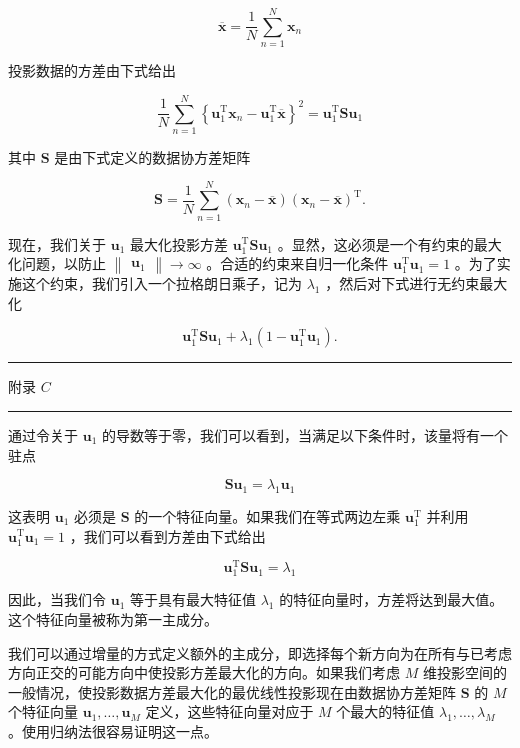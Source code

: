 \documentclass[10pt]{article}
\newcommand{\HRule}{\begin{center}\rule{0.9\linewidth}{0.2mm}\end{center}}
\begin{document}
\[
\overline{\mathbf{x}} = \frac{1}{N}\mathop{\sum }\limits_{{n = 1}}^{N}{\mathbf{x}}_{n} \tag{16.1}
\]

投影数据的方差由下式给出

\[
\frac{1}{N}\mathop{\sum }\limits_{{n = 1}}^{N}{\left\{  {\mathbf{u}}_{1}^{\mathrm{T}}{\mathbf{x}}_{n} - {\mathbf{u}}_{1}^{\mathrm{T}}\overline{\mathbf{x}}\right\}  }^{2} = {\mathbf{u}}_{1}^{\mathrm{T}}\mathbf{S}{\mathbf{u}}_{1} \tag{16.2}
\]

其中 \(\mathbf{S}\) 是由下式定义的数据协方差矩阵

\[
\mathbf{S} = \frac{1}{N}\mathop{\sum }\limits_{{n = 1}}^{N}\left( {{\mathbf{x}}_{n} - \overline{\mathbf{x}}}\right) {\left( {\mathbf{x}}_{n} - \overline{\mathbf{x}}\right) }^{\mathrm{T}}. \tag{16.3}
\]

现在，我们关于 \({\mathbf{u}}_{1}\) 最大化投影方差 \({\mathbf{u}}_{1}^{\mathrm{T}}\mathbf{S}{\mathbf{u}}_{1}\) 。显然，这必须是一个有约束的最大化问题，以防止 \(\begin{Vmatrix}{\mathbf{u}}_{1}\end{Vmatrix} \rightarrow  \infty\) 。合适的约束来自归一化条件 \({\mathbf{u}}_{1}^{\mathrm{T}}{\mathbf{u}}_{1} = 1\) 。为了实施这个约束，我们引入一个拉格朗日乘子，记为 \({\lambda }_{1}\) ，然后对下式进行无约束最大化

\[
{\mathbf{u}}_{1}^{\mathrm{T}}\mathbf{S}{\mathbf{u}}_{1} + {\lambda }_{1}\left( {1 - {\mathbf{u}}_{1}^{\mathrm{T}}{\mathbf{u}}_{1}}\right) . \tag{16.4}
\]

\HRule

附录 \(C\)

\HRule

通过令关于 \({\mathbf{u}}_{1}\) 的导数等于零，我们可以看到，当满足以下条件时，该量将有一个驻点

\[
\mathbf{S}{\mathbf{u}}_{1} = {\lambda }_{1}{\mathbf{u}}_{1} \tag{16.5}
\]

这表明 \({\mathbf{u}}_{1}\) 必须是 \(\mathbf{S}\) 的一个特征向量。如果我们在等式两边左乘 \({\mathbf{u}}_{1}^{\mathrm{T}}\) 并利用 \({\mathbf{u}}_{1}^{\mathrm{T}}{\mathbf{u}}_{1} = 1\) ，我们可以看到方差由下式给出

\[
{\mathbf{u}}_{1}^{\mathrm{T}}\mathbf{S}{\mathbf{u}}_{1} = {\lambda }_{1} \tag{16.6}
\]

因此，当我们令 \({\mathbf{u}}_{1}\) 等于具有最大特征值 \({\lambda }_{1}\) 的特征向量时，方差将达到最大值。这个特征向量被称为第一主成分。

我们可以通过增量的方式定义额外的主成分，即选择每个新方向为在所有与已考虑方向正交的可能方向中使投影方差最大化的方向。如果我们考虑 \(M\) 维投影空间的一般情况，使投影数据方差最大化的最优线性投影现在由数据协方差矩阵 \(\mathbf{S}\) 的 \(M\) 个特征向量 \({\mathbf{u}}_{1},\ldots ,{\mathbf{u}}_{M}\) 定义，这些特征向量对应于 \(M\) 个最大的特征值 \({\lambda }_{1},\ldots ,{\lambda }_{M}\) 。使用归纳法很容易证明这一点。
\end{document}
